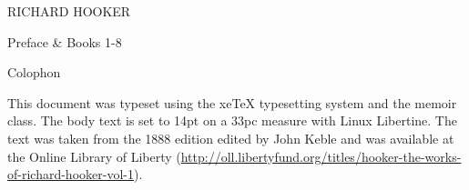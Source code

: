 \documentclass[a4paper,14pt,extrafontsizes]{memoir}
\begin{document}
\frontmatter


\pagestyle{empty}
\begin{center}
  \LARGE{RICHARD HOOKER} \par \vspace{1.2in} 
   \par \vspace{0.2in}
   \par \vspace{0.2in}
   \par \vspace{1.5in}
  \LARGE{Preface \& Books 1-8}
\end{center}

\cleardoublepage
{}
\pagestyle{headings}
\tableofcontents*   %


\mainmatter
{}
\pagestyle{ocd}












\backmatter
\cleardoublepage
\pagestyle{empty}
\null\vfil

\begin{adjustwidth}{1in}{1in}
\begin{center}
{\Large\textsf{Colophon}}
\end{center}
\begin{center}
  This document was typeset using the xeTeX typesetting system
  and the memoir class. The body text is set to 14pt on a
  33pc measure with Linux Libertine. The text was taken from the
  1888 edition edited by John Keble and was available at the 
  Online Library of Liberty
  (\url{http://oll.libertyfund.org/titles/hooker-the-works-of-richard-hooker-vol-1}).
\end{center}
\end{adjustwidth}
 {}  %

\vfil
\end{document}
